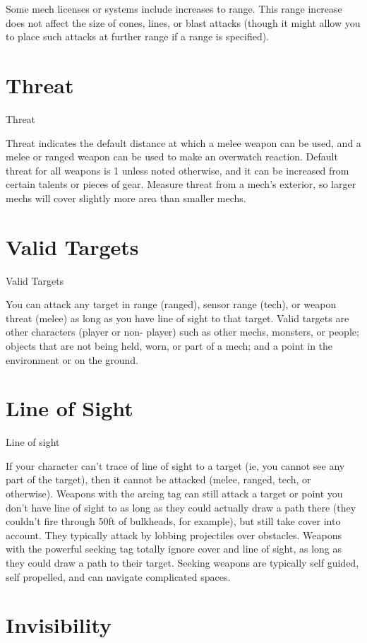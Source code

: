 Some mech licenses or systems include increases to range. This range increase does not affect
the size of cones, lines, or blast attacks (though it might allow you to place such attacks at further
range if a range is specified).
\section{Threat}
                                                     Threat

Threat indicates the default distance at which a melee weapon can be used, and a melee or
ranged weapon can be used to make an overwatch reaction. Default threat for all weapons is 1
unless noted otherwise, and it can be increased from certain talents or pieces of gear. Measure
threat from a mech’s exterior, so larger mechs will cover slightly more area than smaller mechs.
\section{Valid Targets}
                                                Valid Targets

You can attack any target in range (ranged), sensor range (tech), or weapon threat (melee) as
long as you have line of sight to that target. Valid targets are other characters (player or non-
player) such as other mechs, monsters, or people; objects that are not being held, worn, or part of
a mech; and a point in the environment or on the ground.
\section{Line of Sight}
                                                Line of sight

If your character can’t trace of line of sight to a target (ie, you cannot see any part of the target),
then it cannot be attacked (melee, ranged, tech, or otherwise). Weapons with the arcing tag can
still attack a target or point you don’t have line of sight to as long as they could actually draw a
path there (they couldn’t fire through 50ft of bulkheads, for example), but still take cover into
account. They typically attack by lobbing projectiles over obstacles. Weapons with the powerful
seeking tag totally ignore cover and line of sight, as long as they could draw a path to their
target. Seeking weapons are typically self guided, self propelled, and can navigate complicated
spaces.



\section{Invisibility}

